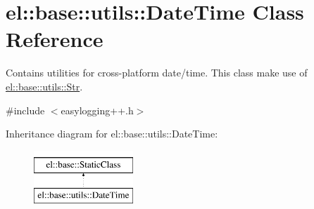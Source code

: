 \hypertarget{classel_1_1base_1_1utils_1_1DateTime}{\section{el\-:\-:base\-:\-:utils\-:\-:Date\-Time Class Reference}
\label{classel_1_1base_1_1utils_1_1DateTime}
}


Contains utilities for cross-\/platform date/time. This class make use of \hyperlink{classel_1_1base_1_1utils_1_1Str}{el\-::base\-::utils\-::\-Str}.  




{\ttfamily \#include $<$easylogging++.\-h$>$}

Inheritance diagram for el\-:\-:base\-:\-:utils\-:\-:Date\-Time\-:\begin{figure}[H]
\begin{center}
\leavevmode
\includegraphics[height=2.000000cm]{classel_1_1base_1_1utils_1_1DateTime}
\end{center}
\end{figure}
